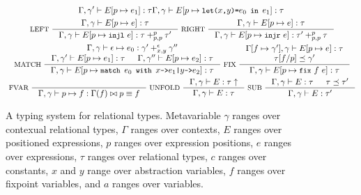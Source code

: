 \begin{figure}
\begin{gather*}
{      %
      \Gamma, \gamma' \judges \upd{ E }{ p }{ e_1 } : \tau }{
      \Gamma, \gamma \judges \upd{E}{p}{ \letexp{x}{y}{e_0}{e_1} } : %
      \tau } \\
    \inference[ LEFT ]{
      \Gamma, \gamma \judges \upd{E}{p}{ e } : \tau }{
      \Gamma, \gamma \judges \upd{E}{p}{ \injl\ e} : %
      \tau +_{p, p}^p \tau' } 
    \inference[ RIGHT ]{
      \Gamma, \gamma \judges \upd{E}{p}{ e } : \tau }{
      \Gamma, \gamma \judges \upd{E}{p}{ \injr\ e} : %
      \tau' +_{p, p}^p \tau } \\
    \inference[ MATCH ]{
      \Gamma, \gamma \judges \epsilon \mapsto e_0 : %
      \gamma' +_{x, y}^\epsilon \gamma'' \\
      \Gamma, \gamma' \judges \upd{E}{p}{e_1} : \tau &
      \Gamma, \gamma'' \judges \upd{E}{p}{e_2} : \tau }{
      \Gamma, \gamma \judges %
      \upd{E}{p}{ \matchexp{e_0}{ x }{e_1}{ y }{e_2} } : \tau } 
    \inference[ FIX ]{
      \upd{ \Gamma }{ f }{ \gamma' }, \gamma \judges %
      \upd{ E }{ p }{ e } : \tau \\
      \replace{ \tau }{ p }{ f } \subtype \gamma' }{ %
      \Gamma, \gamma \judges \upd{ E }{ p }{ \fix{f}{e} }: \tau } \\
    \inference[ FVAR ]{ }{
      \Gamma, \gamma \judges p \mapsto f : %
      \Gamma(f) \joinctr p \equiv f} 
    \inference[ UNFOLD ]{
      \Gamma, \gamma \judges E : \unfold{\tau} }{ 
      \Gamma, \gamma \judges E : \tau } 
    \inference[ SUB ]{
      \Gamma, \gamma \judges E : \tau &
      \tau \subtype \tau' }{ %
      \Gamma, \gamma \judges E : \tau' }
  \end{gather*}
  \caption{A typing system for relational types.
    Metavariable %
    $\gamma$ ranges over contexual relational types, %
    $\Gamma$ ranges over contexts, %
    $E$ ranges over positioned expressions, %
    $p$ ranges over expression positions, %
    $e$ ranges over expressions, %
    $\tau$ ranges over relational types, %
    $c$ ranges over constants, %
    $x$ and $y$ range over abstraction variables, %
    $f$ ranges over fixpoint variables, and %
    $a$ ranges over variables. }
  \label{fig:reltypes-rules}
\end{figure}

